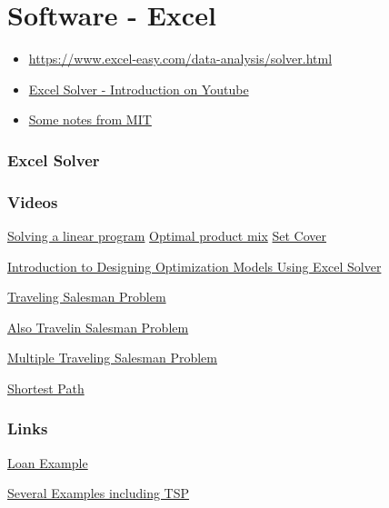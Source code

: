 \chapter{Software - Excel}
\begin{resource}
\begin{itemize}
\item \url{https://www.excel-easy.com/data-analysis/solver.html}
\item \href{https://www.youtube.com/watch?v=dRm5MEoA3OI&ab_channel=LeilaGharani}{Excel Solver - Introduction on Youtube}

\item \href{https://ocw.mit.edu/courses/sloan-school-of-management/15-053-optimization-methods-in-management-science-spring-2013/tutorials/MIT15_053S13_tut03.pdf}{Some notes from MIT}
\end{itemize}
\end{resource}

\subsection{Excel Solver}
\subsection{Videos}
\href{https://www.youtube.com/watch?v=V5DmekIFenA}{Solving a linear program}
\href{https://www.youtube.com/watch?v=6xa1x_Iqjzg}{Optimal product mix}
\href{https://www.youtube.com/watch?v=vpodCzRtUMU}{Set Cover}

\href{https://www.youtube.com/watch?v=tKV24jzZ10s}{Introduction to Designing Optimization Models Using Excel Solver}

\href{https://www.youtube.com/watch?v=-E3rSoClgMI}{Traveling Salesman Problem}

\href{https://www.youtube.com/watch?v=UQYJvSjXE6I}{Also Travelin Salesman Problem}

\href{https://www.youtube.com/watch?v=owHq3Mbniqo}{Multiple Traveling Salesman Problem}

\href{https://www.youtube.com/watch?v=JkZkGxVZ8ao}{Shortest Path}

\subsection{Links}
\href{https://github.com/lobodemonte/excel-solver-loan-example}{Loan Example}

\href{https://github.com/Bhargavanarasimhan/Excel-Solver-Files}{Several Examples including TSP}


